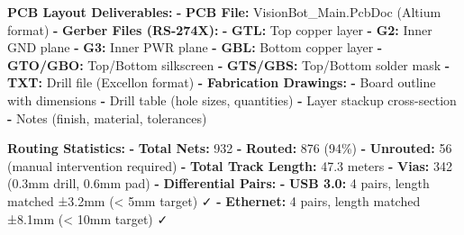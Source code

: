 \documentclass[
]{article}
\newenvironment{Shaded}{\begin{snugshade}}{\end{snugshade}}
\newcommand{\AttributeTok}[1]{\textcolor[rgb]{0.13,0.29,0.53}{#1}}
\newcommand{\DecValTok}[1]{\textcolor[rgb]{0.00,0.00,0.81}{#1}}
\newcommand{\FunctionTok}[1]{\textcolor[rgb]{0.13,0.29,0.53}{\textbf{#1}}}
\newcommand{\KeywordTok}[1]{\textcolor[rgb]{0.13,0.29,0.53}{\textbf{#1}}}
\begin{document}
\begin{Shaded}
\begin{Highlighting}[]
\FunctionTok{PCB Layout Deliverables}\KeywordTok{:}
\AttributeTok{  }\KeywordTok{{-}}\AttributeTok{ }\FunctionTok{PCB File}\KeywordTok{:}\AttributeTok{ VisionBot\_Main.PcbDoc (Altium format)}
\AttributeTok{  }\KeywordTok{{-}}\AttributeTok{ }\FunctionTok{Gerber Files (RS{-}274X)}\KeywordTok{:}
\AttributeTok{      }\KeywordTok{{-}}\AttributeTok{ }\FunctionTok{GTL}\KeywordTok{:}\AttributeTok{ Top copper layer}
\AttributeTok{      }\KeywordTok{{-}}\AttributeTok{ }\FunctionTok{G2}\KeywordTok{:}\AttributeTok{ Inner GND plane}
\AttributeTok{      }\KeywordTok{{-}}\AttributeTok{ }\FunctionTok{G3}\KeywordTok{:}\AttributeTok{ Inner PWR plane}
\AttributeTok{      }\KeywordTok{{-}}\AttributeTok{ }\FunctionTok{GBL}\KeywordTok{:}\AttributeTok{ Bottom copper layer}
\AttributeTok{      }\KeywordTok{{-}}\AttributeTok{ }\FunctionTok{GTO/GBO}\KeywordTok{:}\AttributeTok{ Top/Bottom silkscreen}
\AttributeTok{      }\KeywordTok{{-}}\AttributeTok{ }\FunctionTok{GTS/GBS}\KeywordTok{:}\AttributeTok{ Top/Bottom solder mask}
\AttributeTok{      }\KeywordTok{{-}}\AttributeTok{ }\FunctionTok{TXT}\KeywordTok{:}\AttributeTok{ Drill file (Excellon format)}
\AttributeTok{  }\KeywordTok{{-}}\AttributeTok{ }\FunctionTok{Fabrication Drawings}\KeywordTok{:}
\AttributeTok{      }\KeywordTok{{-}}\AttributeTok{ Board outline with dimensions}
\AttributeTok{      }\KeywordTok{{-}}\AttributeTok{ Drill table (hole sizes, quantities)}
\AttributeTok{      }\KeywordTok{{-}}\AttributeTok{ Layer stackup cross{-}section}
\AttributeTok{      }\KeywordTok{{-}}\AttributeTok{ Notes (finish, material, tolerances)}

\FunctionTok{Routing Statistics}\KeywordTok{:}
\AttributeTok{  }\KeywordTok{{-}}\AttributeTok{ }\FunctionTok{Total Nets}\KeywordTok{:}\AttributeTok{ }\DecValTok{932}
\AttributeTok{  }\KeywordTok{{-}}\AttributeTok{ }\FunctionTok{Routed}\KeywordTok{:}\AttributeTok{ 876 (94\%)}
\AttributeTok{  }\KeywordTok{{-}}\AttributeTok{ }\FunctionTok{Unrouted}\KeywordTok{:}\AttributeTok{ 56 (manual intervention required)}
\AttributeTok{  }\KeywordTok{{-}}\AttributeTok{ }\FunctionTok{Total Track Length}\KeywordTok{:}\AttributeTok{ 47.3 meters}
\AttributeTok{  }\KeywordTok{{-}}\AttributeTok{ }\FunctionTok{Vias}\KeywordTok{:}\AttributeTok{ 342 (0.3mm drill, 0.6mm pad)}
\AttributeTok{  }\KeywordTok{{-}}\AttributeTok{ }\FunctionTok{Differential Pairs}\KeywordTok{:}
\AttributeTok{      }\KeywordTok{{-}}\AttributeTok{ }\FunctionTok{USB 3.0}\KeywordTok{:}\AttributeTok{ 4 pairs, length matched ±3.2mm (\textless{} 5mm target) ✓}
\AttributeTok{      }\KeywordTok{{-}}\AttributeTok{ }\FunctionTok{Ethernet}\KeywordTok{:}\AttributeTok{ 4 pairs, length matched ±8.1mm (\textless{} 10mm target) ✓}


\end{Highlighting}
\end{Shaded}
\end{document}
